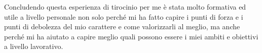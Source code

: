 Concludendo questa esperienza di tirocinio per me è stata molto formativa ed utile a livello personale non solo perché mi ha fatto capire i punti di forza e i punti di debolezza del mio carattere e come valorizzarli al meglio, ma anche perché mi ha aiutato a capire meglio quali possono essere i miei ambiti e obiettivi a livello lavorativo.